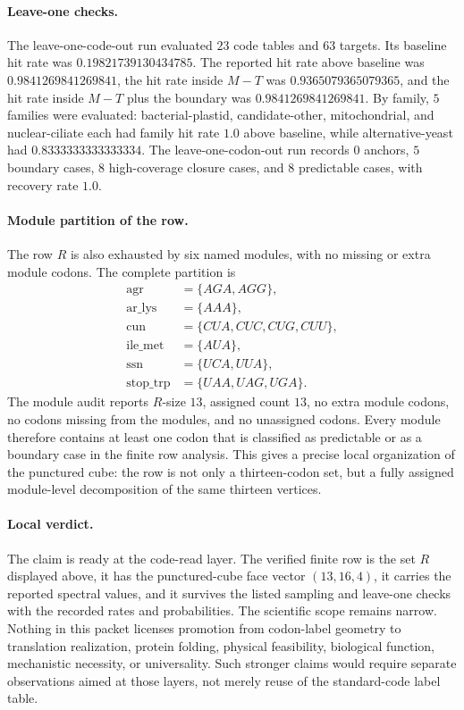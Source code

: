\paragraph{Leave-one checks.}
The leave-one-code-out run evaluated $23$ code tables and $63$ targets.  Its baseline hit rate was $0.19821739130434785$.  The reported hit rate above baseline was $0.9841269841269841$, the hit rate inside $M-T$ was $0.9365079365079365$, and the hit rate inside $M-T$ plus the boundary was $0.9841269841269841$.  By family, $5$ families were evaluated: bacterial-plastid, candidate-other, mitochondrial, and nuclear-ciliate each had family hit rate $1.0$ above baseline, while alternative-yeast had $0.8333333333333334$.  The leave-one-codon-out run records $0$ anchors, $5$ boundary cases, $8$ high-coverage closure cases, and $8$ predictable cases, with recovery rate $1.0$.

\paragraph{Module partition of the row.}
The row $R$ is also exhausted by six named modules, with no missing or extra module codons.  The complete partition is
$$
\begin{aligned}
\mathrm{agr}&=\{AGA,AGG\},\\
\mathrm{ar\_lys}&=\{AAA\},\\
\mathrm{cun}&=\{CUA,CUC,CUG,CUU\},\\
\mathrm{ile\_met}&=\{AUA\},\\
\mathrm{ssn}&=\{UCA,UUA\},\\
\mathrm{stop\_trp}&=\{UAA,UAG,UGA\}.
\end{aligned}
$$
The module audit reports $R$-size $13$, assigned count $13$, no extra module codons, no codons missing from the modules, and no unassigned codons.  Every module therefore contains at least one codon that is classified as predictable or as a boundary case in the finite row analysis.  This gives a precise local organization of the punctured cube: the row is not only a thirteen-codon set, but a fully assigned module-level decomposition of the same thirteen vertices.

\paragraph{Local verdict.}
The claim is ready at the code-read layer.  The verified finite row is the set $R$ displayed above, it has the punctured-cube face vector $(13,16,4)$, it carries the reported spectral values, and it survives the listed sampling and leave-one checks with the recorded rates and probabilities.  The scientific scope remains narrow.  Nothing in this packet licenses promotion from codon-label geometry to translation realization, protein folding, physical feasibility, biological function, mechanistic necessity, or universality.  Such stronger claims would require separate observations aimed at those layers, not merely reuse of the standard-code label table.